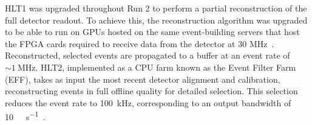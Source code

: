 HLT1 was upgraded throughout Run 2 to perform a partial reconstruction of the full detector readout. To achieve this, the reconstruction algorithm was upgraded to be able to run on GPUs hosted on the same event-building servers that host the FPGA cards required to receive data from the detector at 30 MHz~\cite{LHCb_Allen_GPU}. Reconstructed, selected events are propagated to a buffer at an event rate of ${\sim}\SI{1}{\mega\hertz}$. HLT2, implemented as a CPU farm known as the Event Filter Farm (EFF), takes as input the most recent detector alignment and calibration, reconstructing events in full offline quality for detailed selection. This selection reduces the event rate to \SI{100}{\kilo\hertz}, corresponding to an output bandwidth of \SI{10}{\giga\byte\per\second}~\cite{lhcb_hlt2_storage_run3}.
